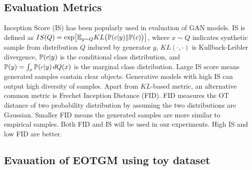 \subsection{Evaluation Metrics}\label{subsec-metric}
Inception Score (IS) has been popularly used in evaluation of GAN
models\cite{NIPS2016_6125}. IS is defined as $
  IS(Q) = \exp\bigl[ \mathbb{E}_{y \sim Q} KL\bigl( \mathbb{P}(c | y)\| \mathbb{P}(c) \bigr)  \bigr]$,
where $x\sim Q$
indicates synthetic sample from distribution $Q$ induced by generator $g$, $KL(\cdot, \cdot)$ is Kullback-Leibler divergence, $\mathbb{P}(c|y)$ is the
conditional class distribution, and $\mathbb{P}(y) = \int_x\mathbb{P}(c|y) \,d Q(x)$
is the marginal class distribution. Large IS score means generated
samples contain clear objects. Generative models with high IS can output high
diversity of samples.
Apart from $KL$-based metric,
an alternative common metric is Frechet Inception Distance (FID)\cite{2017arXiv170608500H}. FID measures the OT distance
of two probability distribution by assuming the two distributions are
Gaussian. Smaller FID means the generated samples are more similar to
empirical samples. Both FID and IS will be used in our experiments. High IS and low FID are better. 

\vspace{-3pt}
\subsection{Evauation of EOTGM using toy dataset}\label{subsec-mg}

